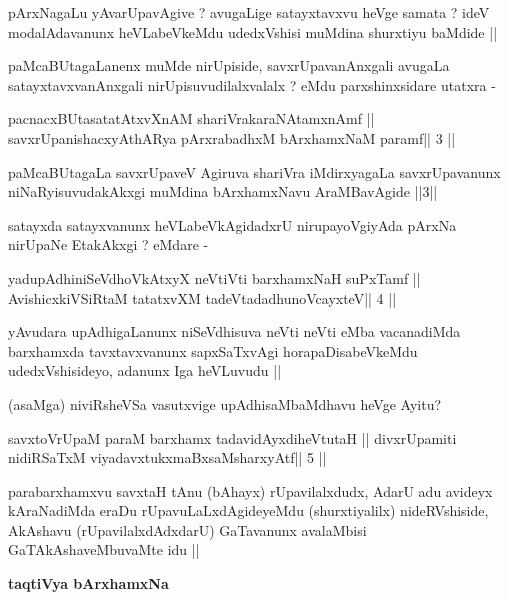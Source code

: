 \begin{artha}
pArxNagaLu yAvarUpavAgive ? avugaLige satayxtavxvu heVge samata ? ideV
modalAdavanunx heVLabeVkeMdu udedxVshisi muMdina shurxtiyu baMdide ||

paMcaBUtagaLanenx muMde nirUpiside, savxrUpavanAnxgali avugaLa
satayxtavxvanAnxgali nirUpisuvudilalxvalalx ? eMdu parxshinxsidare
utatxra -
\end{artha}

\begin{shl}
pacnacxBUtasatatAtxvXnAM shariVrakaraNAtamxnAmf ||
savxrUpanishacxyAthARya pArxrabadhxM bArxhamxNaM paramf\hfill || 3 ||
\end{shl}

\begin{artha}
paMcaBUtagaLa savxrUpaveV Agiruva shariVra iMdirxyagaLa savxrUpavanunx
niNaRyisuvudakAkxgi muMdina bArxhamxNavu AraMBavAgide ||3||
\end{artha}

\begin{artha}
satayxda satayxvanunx heVLabeVkAgidadxrU nirupayoVgiyAda pArxNa
nirUpaNe EtakAkxgi ? eMdare -
\end{artha}

\begin{shl}
yadupAdhiniSeVdhoVkAtxyX neVtiVti barxhamxNaH suPxTamf ||
AvishicxkiVSiRtaM tatatxvXM tadeVtadadhunoVcayxteV\hfill || 4 ||
\end{shl}

\begin{artha}
yAvudara upAdhigaLanunx niSeVdhisuva neVti neVti eMba vacanadiMda
barxhamxda tavxtavxvanunx sapxSaTxvAgi horapaDisabeVkeMdu
udedxVshisideyo, adanunx Iga heVLuvudu ||

(asaMga) niviRsheVSa vasutxvige upAdhisaMbaMdhavu heVge Ayitu?
\end{artha}

\begin{shl}
savxtoV\s rUpaM paraM barxhamx tadavidAyxdiheVtutaH ||
divxrUpamiti nidiRSaTxM viyadavxtukxmaBxsaMsharxyAtf\hfill || 5 ||
\end{shl}

\begin{artha}
parabarxhamxvu savxtaH tAnu (bAhayx) rUpavilalxdudx, AdarU adu avideyx
kAraNadiMda eraDu rUpavuLaLxdAgideyeMdu (shurxtiyalilx) nideRVshiside,
AkAshavu (rUpavilalxdAdxdarU) GaTavanunx avalaMbisi
GaTAkAshaveMbuvaMte idu ||
\end{artha}

\medskip
{\centerline{\textbf{taqtiVya bArxhamxNa}}}

